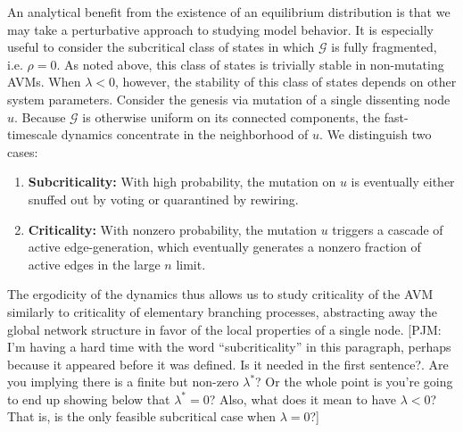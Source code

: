 \documentclass[review, onefignum, onetabnum]{siamart171218}
\newcommand{\pjm}[1]{{\color{blue}[PJM: #1]}}
\begin{document}
	An analytical benefit from the existence of an equilibrium distribution is that we may take a perturbative approach to studying model behavior. 
	It is especially useful to consider the subcritical class of states in which $\mathcal{G}$ is fully fragmented, i.e. $\rho = 0$.
	As noted above, this class of states is trivially stable in non-mutating AVMs. 
	When $\lambda < 0$, however, the stability of this class of states depends on other system parameters. 
	Consider the genesis via mutation of a single dissenting node $u$. 
	Because $\mathcal{G}$ is otherwise uniform on its connected components, the fast-timescale dynamics concentrate in the neighborhood of $u$. 
	We distinguish two cases: 
	\begin{enumerate}
		\item \textbf{Subcriticality:} With high probability, the mutation on $u$ is eventually either snuffed out by voting or quarantined by rewiring. 
		\item \textbf{Criticality:} With nonzero probability, the mutation $u$ triggers a cascade of active edge-generation, which eventually generates a nonzero fraction of active edges in the large $n$ limit. 
	\end{enumerate}
	The ergodicity of the dynamics thus allows us to study criticality of the AVM similarly to criticality of elementary branching processes, abstracting away the global network structure in favor of the local properties of a single node. \pjm{I'm having a hard time with the word ``subcriticality'' in this paragraph, perhaps because it appeared before it was defined. Is it needed in the first sentence?. Are you implying there is a finite but non-zero $\lambda^*$? Or the whole point is you're going to end up showing below that $\lambda^*=0$? Also, what does it mean to have $\lambda<0$? That is, is the only feasible subcritical case when $\lambda=0$?}
	
\end{document}
